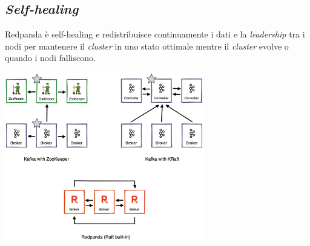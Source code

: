 \subsection{\textit{Self-healing}}
Redpanda è self-healing e redistribuisce continuamente i dati e la \textit{leadership} tra i nodi per mantenere il \textit{cluster} in uno stato ottimale mentre il \textit{cluster} evolve o quando i nodi falliscono.


\begin{center}
	\includegraphics[width=0.65\textwidth]{imgs/kafka_zookeeper.png}
\end{center}












